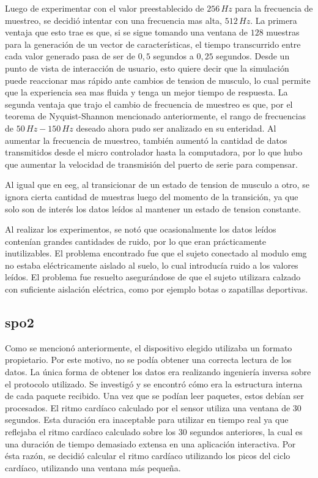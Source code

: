 Luego de experimentar con el valor preestablecido de $256\,Hz$ para la frecuencia de muestreo, se decidió intentar con una frecuencia mas alta, $512\,Hz$. La primera ventaja que esto trae es que, si se sigue tomando una ventana de $128$ muestras para la generación de un vector de características, el tiempo transcurrido entre cada valor generado pasa de ser de $0,5$ segundos a $0,25$ segundos. Desde un punto de vista de interacción de usuario, esto quiere decir que la simulación puede reaccionar mas rápido ante cambios de tension de musculo, lo cual permite que la experiencia sea mas fluida y tenga un mejor tiempo de respuesta. La segunda ventaja que trajo el cambio de frecuencia de muestreo es que, por el teorema de Nyquist-Shannon mencionado anteriormente, el rango de frecuencias de $50 \, Hz-150 \, Hz$ deseado ahora pudo ser analizado en su enteridad. Al aumentar la frecuencia de muestreo, también aumentó la cantidad de datos transmitidos desde el micro controlador hasta la computadora, por lo que hubo que aumentar la velocidad de transmisión del puerto de serie para compensar.

Al igual que en \acrshort{eeg}, al transicionar de un estado de tension de musculo a otro, se ignora cierta cantidad de muestras luego del momento de la transición, ya que solo son de interés los datos leídos al mantener un estado de tension constante. 

Al realizar los experimentos, se notó que ocasionalmente los datos leídos contenían grandes cantidades de ruido, por lo que eran prácticamente inutilizables. El problema encontrado fue que el sujeto conectado al modulo \acrshort{emg} no estaba eléctricamente aislado al suelo, lo cual introducía ruido a los valores leídos. El problema fue resuelto asegurándose de que el sujeto utilizara calzado con suficiente aislación eléctrica, como por ejemplo botas o zapatillas deportivas.

\subsection{\acrshort{spo2}} \label{sec:spo2-signal-processing}

Como se mencionó anteriormente, el dispositivo elegido utilizaba un formato propietario. Por este motivo, no se podía obtener una correcta lectura de los datos. La única forma de obtener los datos era realizando ingeniería inversa sobre el protocolo utilizado. Se investigó y se encontró cómo era la estructura interna de cada paquete recibido. Una vez que se podían leer paquetes, estos debían ser procesados. El ritmo cardíaco calculado por el sensor utiliza una ventana de 30 segundos. Esta duración era inaceptable para utilizar en tiempo real ya que reflejaba el ritmo cardíaco calculado sobre los 30 segundos anteriores, la cual es una duración de tiempo demasiado extensa en una aplicación interactiva. Por ésta razón, se decidió calcular el ritmo cardíaco utilizando los picos del ciclo cardíaco, utilizando una ventana más pequeña.

